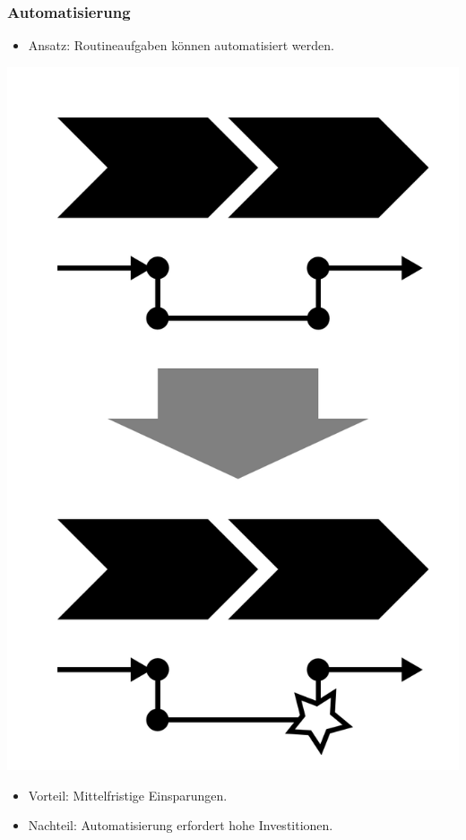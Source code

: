 \documentclass[xcolor=dvipsnames]{beamer}
\begin{document}
 \begin{frame}
  \frametitle{Automatisierung}
  \begin{itemize}
    \item Ansatz: Routineaufgaben können automatisiert werden.
  \end{itemize}
  \centerline{\includegraphics[scale=2.5]{4_6_4.png}}
  \begin{itemize}
    \item Vorteil: Mittelfristige Einsparungen.
    \item Nachteil: Automatisierung erfordert hohe Investitionen.
  \end{itemize}
 \end{frame}
\end{document}
